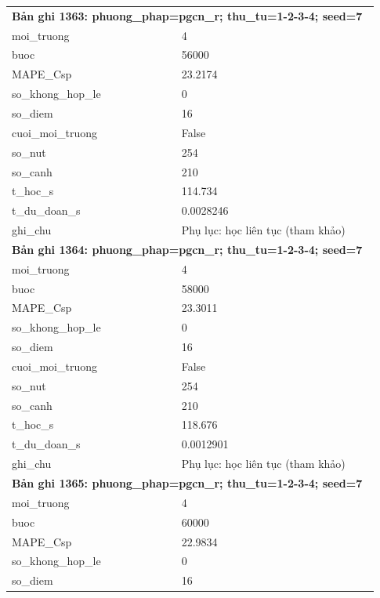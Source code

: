 \begin{longtable}{p{0.43\linewidth}p{0.50\linewidth}}
\midrule
\multicolumn{2}{p{0.95\linewidth}}{\textbf{Bản ghi 1363: phuong\_phap=pgcn\_r; thu\_tu=1-2-3-4; seed=7}} \\
moi\_\allowbreak truong & 4 \\
buoc & 56000 \\
MAPE\_\allowbreak Csp & 23.2174 \\
so\_\allowbreak khong\_\allowbreak hop\_\allowbreak le & 0 \\
so\_\allowbreak diem & 16 \\
cuoi\_\allowbreak moi\_\allowbreak truong & False \\
so\_\allowbreak nut & 254 \\
so\_\allowbreak canh & 210 \\
t\_\allowbreak hoc\_\allowbreak s & 114.734 \\
t\_\allowbreak du\_\allowbreak doan\_\allowbreak s & 0.0028246 \\
ghi\_\allowbreak chu & Phụ lục: học liên tục (tham khảo) \\
\midrule
\multicolumn{2}{p{0.95\linewidth}}{\textbf{Bản ghi 1364: phuong\_phap=pgcn\_r; thu\_tu=1-2-3-4; seed=7}} \\
moi\_\allowbreak truong & 4 \\
buoc & 58000 \\
MAPE\_\allowbreak Csp & 23.3011 \\
so\_\allowbreak khong\_\allowbreak hop\_\allowbreak le & 0 \\
so\_\allowbreak diem & 16 \\
cuoi\_\allowbreak moi\_\allowbreak truong & False \\
so\_\allowbreak nut & 254 \\
so\_\allowbreak canh & 210 \\
t\_\allowbreak hoc\_\allowbreak s & 118.676 \\
t\_\allowbreak du\_\allowbreak doan\_\allowbreak s & 0.0012901 \\
ghi\_\allowbreak chu & Phụ lục: học liên tục (tham khảo) \\
\midrule
\multicolumn{2}{p{0.95\linewidth}}{\textbf{Bản ghi 1365: phuong\_phap=pgcn\_r; thu\_tu=1-2-3-4; seed=7}} \\
moi\_\allowbreak truong & 4 \\
buoc & 60000 \\
MAPE\_\allowbreak Csp & 22.9834 \\
so\_\allowbreak khong\_\allowbreak hop\_\allowbreak le & 0 \\
so\_\allowbreak diem & 16 \\

\end{longtable}
